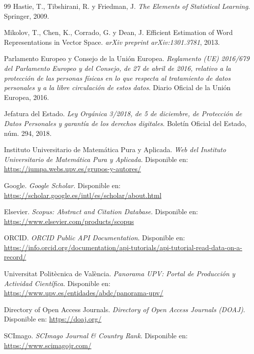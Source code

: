 \documentclass[11pt,spanish,listoffigures,listoftables]{tfgetsinf}
\begin{document}
\begin{thebibliography}{99}
Hastie, T., Tibshirani, R. y Friedman, J.
\newblock \textit{The Elements of Statistical Learning}.
\newblock Springer, 2009.

Mikolov, T., Chen, K., Corrado, G. y Dean, J.
\newblock Efficient Estimation of Word Representations in Vector Space.
\newblock \textit{arXiv preprint arXiv:1301.3781}, 2013.

Parlamento Europeo y Consejo de la Unión Europea.
\newblock \textit{Reglamento (UE) 2016/679 del Parlamento Europeo y del Consejo, de 27 de abril de 2016, relativo a la protección de las personas físicas en lo que respecta al tratamiento de datos personales y a la libre circulación de estos datos}.
\newblock Diario Oficial de la Unión Europea, 2016.

Jefatura del Estado.
\newblock \textit{Ley Orgánica 3/2018, de 5 de diciembre, de Protección de Datos Personales y garantía de los derechos digitales}.
\newblock Boletín Oficial del Estado, núm. 294, 2018.

Instituto Universitario de Matemática Pura y Aplicada.
\newblock \textit{Web del Instituto Universitario de Matemática Pura y Aplicada}.
\newblock Disponible en: \url{https://iumpa.webs.upv.es/grupos-y-autores/}

Google.
\newblock \textit{Google Scholar}.
\newblock Disponible en: \url{https://scholar.google.es/intl/es/scholar/about.html}

Elsevier.
\newblock \textit{Scopus: Abstract and Citation Database}.
\newblock Disponible en: \url{https://www.elsevier.com/products/scopus}

ORCID.
\newblock \textit{ORCID Public API Documentation}.
\newblock Disponible en: \url{https://info.orcid.org/documentation/api-tutorials/api-tutorial-read-data-on-a-record/}

Universitat Politècnica de València.
\newblock \textit{Panorama UPV: Portal de Producción y Actividad Científica}.
\newblock Disponible en: \url{https://www.upv.es/entidades/abdc/panorama-upv/}

Directory of Open Access Journals.
\newblock \textit{Directory of Open Access Journals (DOAJ)}.
\newblock Disponible en: \url{https://doaj.org/}

SCImago.
\newblock \textit{SCImago Journal \& Country Rank}.
\newblock Disponible en: \url{https://www.scimagojr.com/}


\end{thebibliography}
\end{document}
